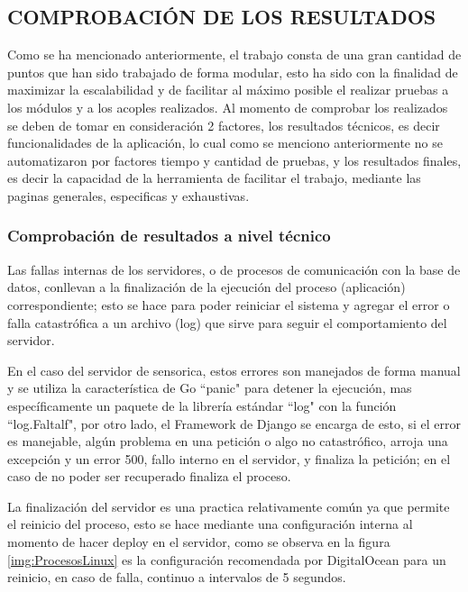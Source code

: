 
\subsection{COMPROBACIÓN DE LOS RESULTADOS}

Como se ha mencionado anteriormente, el trabajo consta de una gran cantidad de
puntos que han sido trabajado de forma modular, esto ha sido con la finalidad
de maximizar la escalabilidad y de facilitar al máximo posible el realizar pruebas
a los módulos y a los acoples realizados. Al momento de comprobar los realizados
se deben de tomar en consideración 2 factores, los resultados técnicos, es decir
funcionalidades de la aplicación, lo cual como se menciono anteriormente no se
automatizaron por factores tiempo y cantidad de pruebas, y los resultados finales,
es decir la capacidad de la herramienta de facilitar el trabajo, mediante
las paginas generales, especificas y exhaustivas.

\subsubsection{Comprobación de resultados a nivel técnico}

Las fallas internas de los servidores, o de procesos de comunicación
con la base de datos, conllevan a la finalización de la ejecución del proceso
(aplicación) correspondiente; esto se hace para poder reiniciar el sistema y
agregar el error o falla catastrófica a un archivo (log) que sirve para seguir el
comportamiento del servidor.

En el caso del servidor de sensorica, estos errores son manejados de forma manual
y se utiliza la característica de Go ``panic" para detener la ejecución, mas
específicamente un paquete de la librería estándar ``log" con la función ``log.Faltalf",
por otro lado, el Framework de Django se encarga de esto, si el error es manejable,
algún problema en una petición o algo no catastrófico, arroja una excepción y un
error 500, fallo interno en el servidor, y finaliza la petición; en el caso de no
poder ser recuperado finaliza el proceso.

La finalización del servidor es una practica relativamente común ya que permite
el reinicio del proceso, esto se hace mediante una configuración interna al
momento de hacer deploy en el servidor, como se observa en la figura \ref{img:ProcesosLinux}
es la configuración recomendada por DigitalOcean para un reinicio, en caso de falla,
continuo a intervalos de 5 segundos.

